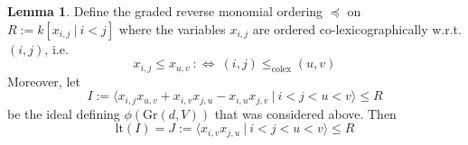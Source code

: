 \documentclass{scrartcl}
\newcommand{\Gr}{\mathrm{Gr}}
\theoremstyle{definition}
\newtheorem{lemma}[definition]{Lemma}
\begin{document}
\begin{lemma}
    Define the graded reverse monomial ordering $\preceq$ on $R := k[x_{i, j} \ | \ i < j]$ where the variables $x_{i, j}$ are ordered co-lexicographically w.r.t. $(i, j)$, i.e.
    \begin{equation*}
        x_{i, j} \leq x_{u, v} \ :\Leftrightarrow \ (i, j) \leq_{\text{colex}} (u, v)
    \end{equation*}
    Moreover, let
    \begin{equation*}
        I := \langle x_{i, j}x_{u, v} + x_{i, v}x_{j, u} - x_{i, u}x_{j, v} \ | \ i < j < u < v \rangle \leq R
    \end{equation*}
    be the ideal defining $\phi(\Gr(d, V))$ that was considered above. Then
    \begin{equation*}
        \mathrm{lt}(I) = J := \langle x_{i, v} x_{j, u} \ | \ i < j < u < v \rangle \leq R
    \end{equation*}
\end{lemma}
\end{document}
